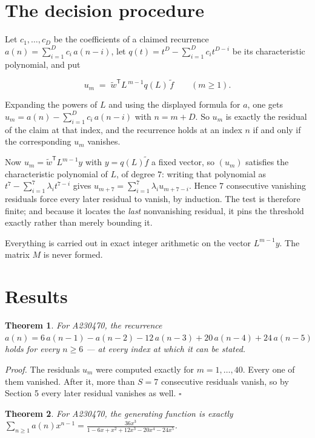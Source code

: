 \documentclass[11pt]{article}
\newtheorem{theorem}{Theorem}
\theoremstyle{definition}
\begin{document}
\section{The decision procedure}

Let $c_1,\dots,c_D$ be the coefficients of a claimed recurrence $a(n) = \sum_{i=1}^{D} c_i\,a(n-i)$, let $q(t) = t^{D} - \sum_{i=1}^{D} c_i t^{D-i}$ be its characteristic polynomial, and put

\[u_m \;=\; \tilde w^{\mathsf T} L^{\,m-1} q(L)\,\tilde f \qquad (m \ge 1).\]

Expanding the powers of $L$ and using the displayed formula for $a$, one gets $u_m = a(n) - \sum_{i=1}^{D} c_i\,a(n-i)$ with $n = m + D$. So $u_m$ is exactly the residual of the claim at that index, and the recurrence holds at an index $n$ if and only if the corresponding $u_m$ vanishes.

Now $u_m = \tilde w^{\mathsf T} L^{m-1} y$ with $y = q(L)\tilde f$ a fixed vector, so $(u_m)$ satisfies the characteristic polynomial of $L$, of degree $7$: writing that polynomial as $t^{7} - \sum_{i=1}^{7} \lambda_i t^{7-i}$ gives $u_{m+7} = \sum_{i=1}^{7} \lambda_i u_{m+7-i}$. Hence $7$ consecutive vanishing residuals force every later residual to vanish, by induction. The test is therefore finite; and because it locates the {\itshape last} nonvanishing residual, it pins the threshold exactly rather than merely bounding it.

Everything is carried out in exact integer arithmetic on the vector $L^{m-1}y$. The matrix $M$ is never formed.

\section{Results}

\begin{theorem} For A230470, the recurrence $a(n) = 6\,a(n-1) - a(n-2) - 12\,a(n-3) + 20\,a(n-4) + 24\,a(n-5)$ holds for every $n \ge 6$ --- at every index at which it can be stated.\end{theorem}

{\itshape Proof.} The residuals $u_m$ were computed exactly for $m = 1,\dots,40$. Every one of them vanished. After it, more than $S = 7$ consecutive residuals vanish, so by Section 5 every later residual vanishes as well. $\square$

\begin{theorem} For A230470, the generating function is exactly $\sum_{n\ge 1} a(n)x^{n-1} = \frac{36x^{3}}{1 - 6x + x^{2} + 12x^{3} - 20x^{4} - 24x^{5}}$.\end{theorem}
\end{document}
